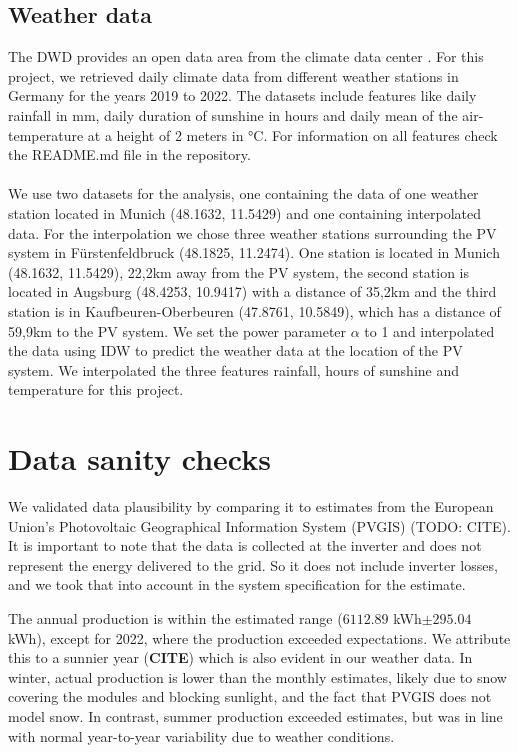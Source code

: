 \documentclass{article}
\begin{document}
\subsection{Weather data}
The DWD provides an open data area from the climate data center \cite{CDC}. 
For this project, we retrieved daily climate data from different weather stations in Germany for the years 2019 to 2022. 
The datasets include features like daily rainfall in mm, daily duration of sunshine in hours and daily mean of the air-temperature at a height of 2 meters in °C. 
For information on all features check the README.md file in the repository. \\ 
\\
We use two datasets for the analysis, one containing the data of one weather station located in Munich (48.1632, 11.5429) and one containing interpolated data. For the interpolation we chose three weather stations surrounding the PV system in Fürstenfeldbruck (48.1825, 11.2474). 
One station is located in Munich (48.1632, 11.5429), 22,2km away from the PV system, the second station is located in Augsburg (48.4253, 10.9417) with a distance of 35,2km and the third station is in Kaufbeuren-Oberbeuren (47.8761, 10.5849), which has a distance of 59,9km to the PV system. 
We set the power parameter $\alpha$ to 1 and interpolated the data using IDW to predict the weather data at the location of the PV system. We interpolated the three features rainfall, hours of sunshine and temperature for this project.

\section{Data sanity checks}\label{sec:methods}

We validated data plausibility by comparing it to estimates from the European Union's Photovoltaic Geographical Information System (PVGIS) (TODO: CITE). It is important to note that the data is collected at the inverter and does not represent the energy delivered to the grid. So it does not include inverter losses, and we took that into account in the system specification for the estimate.

The annual production is within the estimated range ($6112.89$ kWh$ \pm 295.04$ kWh), except for 2022, where the production exceeded expectations. We attribute this to a sunnier year (\textbf{CITE}) which is also evident in our weather data. In winter, actual production is lower than the monthly estimates, likely due to snow covering the modules and blocking sunlight, and the fact that PVGIS does not model snow. In contrast, summer production exceeded estimates, but was in line with normal year-to-year variability due to weather conditions.
\end{document}

